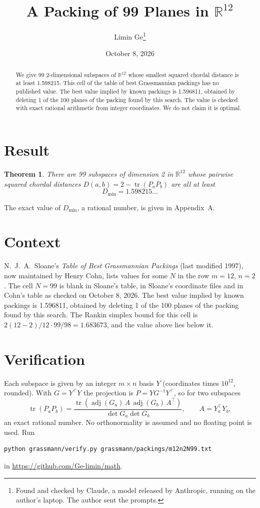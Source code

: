 \documentclass[11pt,a4paper]{article}
\title{A Packing of 99 Planes in $\mathbb{R}^{12}$}
\author{Limin Ge\thanks{Found and checked by Claude, a model released by Anthropic, running on the author's laptop. The author sent the prompts.}}
\date{October 8, 2026}
\newtheorem*{theorem}{Theorem}
\begin{document}
\maketitle
\begin{abstract}
We give 99 2-dimensional subspaces of $\mathbb{R}^{12}$ whose smallest squared chordal distance is at least 1.598215. This cell of the table of best Grassmannian packings has no published value. The best value implied by known packings is 1.596811, obtained by deleting 1 of the 100 planes of the packing found by this search. The value is checked with exact rational arithmetic from integer coordinates. We do not claim it is optimal.
\end{abstract}

\section{Result}
\begin{theorem}
There are 99 subspaces of dimension 2 in $\mathbb{R}^{12}$ whose pairwise squared chordal distances $D(a,b) = 2 - \operatorname{tr}(P_aP_b)$ are all at least
\[ D_{\min} = 1.598215\ldots \]
\end{theorem}
The exact value of $D_{\min}$, a rational number, is given in Appendix~A.


\section{Context}
N.~J.~A.~Sloane's \emph{Table of Best Grassmannian Packings} (last modified 1997), now maintained by Henry Cohn, lists values for some $N$ in the row $m=12$, $n=2$. The cell $N=99$ is blank in Sloane's table, in Sloane's coordinate files and in Cohn's table as checked on October 8, 2026. The best value implied by known packings is 1.596811, obtained by deleting 1 of the 100 planes of the packing found by this search. The Rankin simplex bound for this cell is $2(12-2)/12\cdot 99/98 = 1.683673$, and the value above lies below it.


\section{Verification}
Each subspace is given by an integer $m\times n$ basis $Y$ (coordinates times $10^{12}$, rounded). With $G=Y^\top Y$ the projection is $P=YG^{-1}Y^\top$, so for two subspaces
\[ \operatorname{tr}(P_aP_b)=\frac{\operatorname{tr}(\operatorname{adj}(G_a)\,A\,\operatorname{adj}(G_b)\,A^\top)}{\det G_a\det G_b},\qquad A=Y_a^\top Y_b, \]
an exact rational number. No orthonormality is assumed and no floating point is used. Run
\begin{verbatim}
python grassmann/verify.py grassmann/packings/m12n2N99.txt
\end{verbatim}
in \url{https://github.com/Ge-limin/math}.
\end{document}
